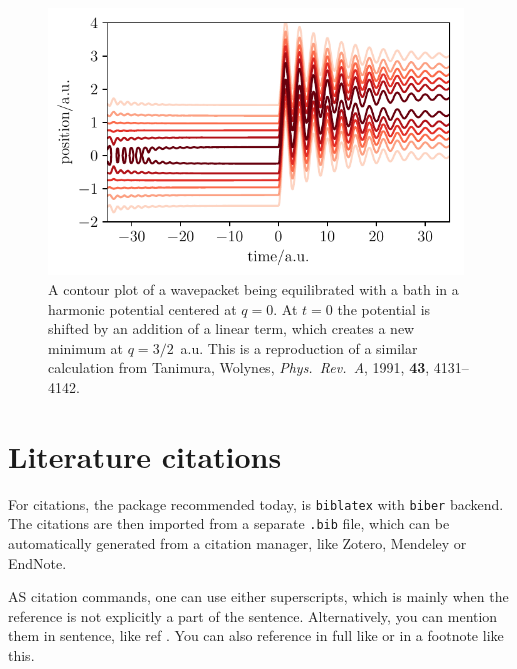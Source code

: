 \documentclass[11pt]{article}
\begin{document}
\begin{figure} [htp!]
    \centering
    \includegraphics [width=11cm]{qheom_contour.pdf}
    \caption{
        A contour plot of a wavepacket being equilibrated with a bath in a harmonic potential centered at $q=0$. At $t=0$ the potential is shifted by an addition of a linear term, which creates a new minimum at $q=3/2$~a.u. This is a reproduction of a similar calculation from Tanimura, Wolynes, \emph{Phys.~Rev.~A}, 1991, \textbf{43}, 4131–4142.
    }
    \label{fig:qheom_contour}
\end{figure}

\section{Literature citations}
For citations, the package recommended today, is \texttt{biblatex} with \texttt{biber} backend. The citations are then imported from a separate \texttt{.bib} file, which can be automatically generated from a citation manager, like Zotero, Mendeley or EndNote.

AS citation commands, one can use either superscripts, which is mainly when the reference is not explicitly a part of the sentence.\supercite{cit1} Alternatively, you can mention them in sentence, like ref \cite{cit2}. You can also reference in full like  or in a footnote like this.
\printbibliography
\end{document}
